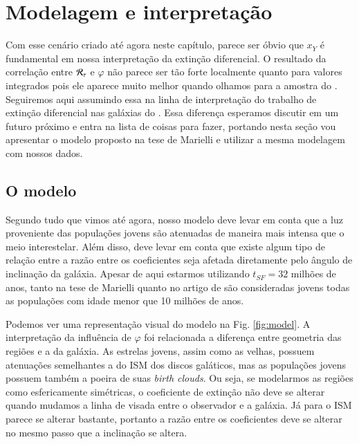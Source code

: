 \section{Modelagem e interpretação}
\label{sec:difextin:modeleinterp}

Com esse cenário criado até agora neste capítulo, parece ser óbvio que $x_Y$ é fundamental em nossa
interpretação da extinção diferencial. O resultado da correlação entre $\mathcal{R}_\tau$ e $\varphi$
não parece ser tão forte localmente quanto para valores integrados pois ele aparece muito melhor
quando olhamos para a amostra do \SDSS. Seguiremos aqui assumindo essa na linha de interpretação do
trabalho de extinção diferencial nas galáxias do \SDSS. Essa diferença esperamos discutir em um
futuro próximo e entra na lista de coisas para fazer, portando nesta seção vou apresentar o modelo
proposto na tese de Marielli e utilizar a mesma modelagem com nossos dados.

\subsection{O modelo}
\label{sec:difextin:modeleinterp:model}

Segundo tudo que vimos até agora, nosso modelo deve levar em conta que a luz proveniente das
populações jovens são atenuadas de maneira mais intensa que o meio interestelar. Além disso, deve
levar em conta que existe algum tipo de relação entre a razão entre os coeficientes seja afetada
diretamente pelo ângulo de inclinação da galáxia. Apesar de aqui estarmos utilizando $t_{SF} = 32$
milhões de anos, tanto na tese de Marielli quanto no artigo de \citet{Charlot.Fall.2000a} são
consideradas jovens todas as populações com idade menor que 10 milhões de anos.

Podemos ver uma representação visual do modelo na Fig. \ref{fig:model}. A interpretação da
influência de $\varphi$ foi relacionada a diferença entre geometria das regiões \Hii e a da galáxia.
As estrelas jovens, assim como as velhas, possuem atenuações semelhantes a do ISM dos discos
galáticos, mas as populações jovens possuem também a poeira de suas {\em birth clouds}. Ou seja, se
modelarmos as regiões \Hii como esfericamente simétricas, o coeficiente de extinção não deve se
alterar quando mudamos a linha de visada entre o observador e a galáxia. Já para o ISM parece se
alterar bastante, portanto a razão entre os coeficientes deve se alterar no mesmo passo que a
inclinação se altera.


